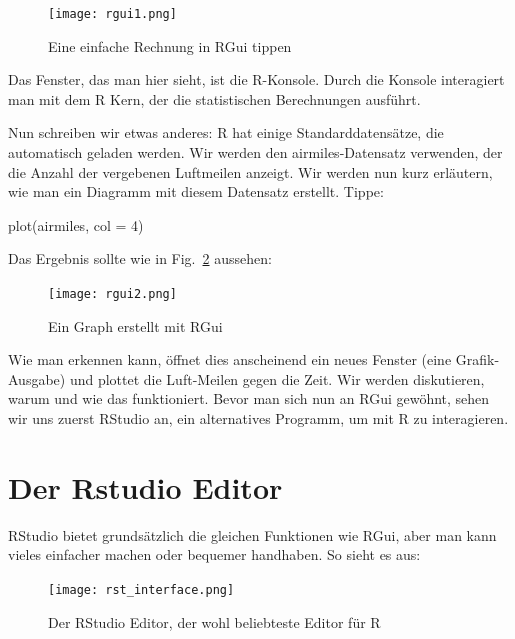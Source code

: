 \documentclass[a4paper,twoside]{tufte-book}\usepackage[]{graphicx}\usepackage[]{color}
\begin{document}
\begin{appendices}
\begin{figure}[]
\begin{center}
\texttt{[image: rgui1.png]}
\caption{Eine einfache Rechnung in RGui tippen}
\label{fig: Rgui1}
\end{center}
\end{figure}

Das Fenster, das man hier sieht, ist die R-Konsole. Durch die Konsole interagiert man mit dem R Kern, der die statistischen Berechnungen ausführt.

Nun schreiben wir etwas anderes: R hat einige Standarddatensätze, die automatisch geladen werden. Wir werden den airmiles-Datensatz verwenden, der die Anzahl der vergebenen Luftmeilen anzeigt. Wir werden nun kurz erläutern, wie man ein Diagramm mit diesem Datensatz erstellt. Tippe:

\begin{Schunk}
\begin{Sinput}
plot(airmiles, col = 4)
\end{Sinput}
\end{Schunk}

Das Ergebnis sollte wie in Fig.~\ref{fig: Rgui2} aussehen:

\begin{figure}[]
\begin{center}
\texttt{[image: rgui2.png]}
\caption{Ein Graph erstellt mit RGui}
\label{fig: Rgui2}
\end{center}
\end{figure}

Wie man erkennen kann, öffnet dies anscheinend ein neues Fenster (eine Grafik-Ausgabe) und plottet die Luft-Meilen gegen die Zeit. Wir werden diskutieren, warum und wie das funktioniert. Bevor man sich nun an RGui gewöhnt, sehen wir uns zuerst RStudio an, ein alternatives Programm, um mit R zu interagieren.

\section{Der Rstudio Editor}
 
RStudio bietet grundsätzlich die gleichen Funktionen wie RGui, aber man kann vieles einfacher machen oder bequemer handhaben. So sieht es aus:

\begin{figure}[]
\begin{center}
\texttt{[image: rst\_interface.png]}
\caption{Der RStudio Editor, der wohl beliebteste Editor für R}
\label{fig: Rstudio}
\end{center}
\end{figure}



\end{appendices}
\end{document}
